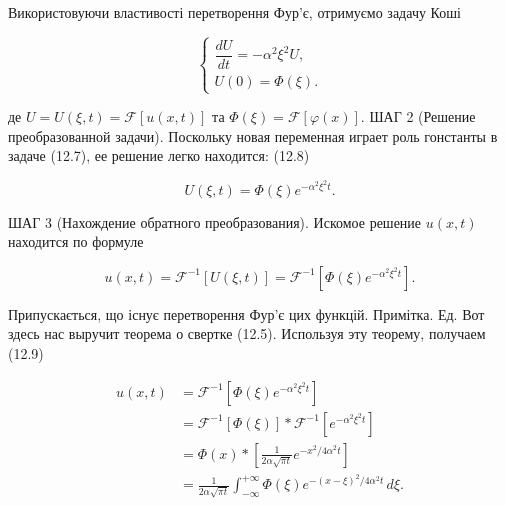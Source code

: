 \documentclass[
  ukrainian,
]{article}
\begin{document}
Використовуючи властивості перетворення Фур'є, отримуємо задачу Коші

\[
\begin{cases}
\dfrac{dU}{dt}=-\alpha^2\xi^2U,\\
U(0)=\Phi(\xi).
\end{cases}
\]

де \(U=U(\xi,t)=\mathcal{F}[u(x,t)]\) та
\(\Phi(\xi)=\mathcal{F}[\varphi(x)]\). ШАГ 2 (Решение преобразованной
задачи). Поскольку новая переменная играет роль гонстанты в задаче
(12.7), ее решение легко находится: (12.8)

\[
U(\xi,t)=\Phi(\xi)e^{-\alpha^2\xi^2 t}.
\]

ШАГ 3 (Нахождение обратного преобразования). Искомое решение \(u(x,t)\)
находится по формуле

\[
u(x, t) = \mathcal{F}^{-1}\!\left[U(\xi, t)\right]
= \mathcal{F}^{-1}\!\left[\Phi(\xi)e^{-\alpha^2 \xi^2 t}\right].
\]

Припускається, що існує перетворення Фур'є цих функцій. Примітка. Ед.
Вот здесь нас выручит теорема о свертке (12.5). Используя эту теорему,
получаем (12.9)

\[
\begin{aligned}
u(x, t)
&= \mathcal{F}^{-1}\!\left[\Phi(\xi)e^{-\alpha^{2}\xi^{2} t}\right] \\
&= \mathcal{F}^{-1}\!\left[\Phi(\xi)\right] * \mathcal{F}^{-1}\!\left[e^{-\alpha^{2}\xi^{2} t}\right] \\
&= \Phi(x) * \left[\frac{1}{2\alpha \sqrt{\pi t}} e^{-x^{2}/4\alpha^{2} t}\right] \\
&= \frac{1}{2\alpha \sqrt{\pi t}} \int_{-\infty}^{+\infty} \Phi(\xi)e^{-(x-\xi)^{2}/4\alpha^{2} t}\,d\xi.
\end{aligned}
\]
\end{document}
